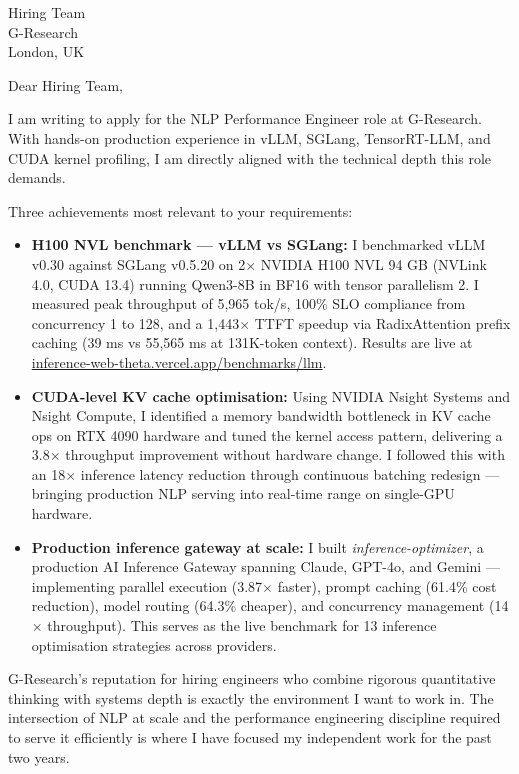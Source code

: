 \documentclass[12pt,a4paper]{letter}
\date{\today}
\begin{document}
\begin{letter}{Hiring Team \\ G-Research \\ London, UK}

\opening{Dear Hiring Team,}

I am writing to apply for the NLP Performance Engineer role at G-Research. With hands-on production experience in vLLM, SGLang, TensorRT-LLM, and CUDA kernel profiling, I am directly aligned with the technical depth this role demands.

Three achievements most relevant to your requirements:

\begin{itemize}
  \item \textbf{H100 NVL benchmark — vLLM vs SGLang:} I benchmarked vLLM v0.30 against SGLang v0.5.20 on 2$\times$ NVIDIA H100 NVL 94 GB (NVLink 4.0, CUDA 13.4) running Qwen3-8B in BF16 with tensor parallelism 2. I measured peak throughput of 5,965 tok/s, 100\% SLO compliance from concurrency 1 to 128, and a 1,443$\times$ TTFT speedup via RadixAttention prefix caching (39 ms vs 55,565 ms at 131K-token context). Results are live at \href{https://inference-web-theta.vercel.app/benchmarks/llm}{inference-web-theta.vercel.app/benchmarks/llm}.

  \item \textbf{CUDA-level KV cache optimisation:} Using NVIDIA Nsight Systems and Nsight Compute, I identified a memory bandwidth bottleneck in KV cache ops on RTX 4090 hardware and tuned the kernel access pattern, delivering a 3.8$\times$ throughput improvement without hardware change. I followed this with an 18$\times$ inference latency reduction through continuous batching redesign — bringing production NLP serving into real-time range on single-GPU hardware.

  \item \textbf{Production inference gateway at scale:} I built \textit{inference-optimizer}, a production AI Inference Gateway spanning Claude, GPT-4o, and Gemini — implementing parallel execution (3.87$\times$ faster), prompt caching (61.4\% cost reduction), model routing (64.3\% cheaper), and concurrency management (14$\times$ throughput). This serves as the live benchmark for 13 inference optimisation strategies across providers.
\end{itemize}

G-Research's reputation for hiring engineers who combine rigorous quantitative thinking with systems depth is exactly the environment I want to work in. The intersection of NLP at scale and the performance engineering discipline required to serve it efficiently is where I have focused my independent work for the past two years.


\end{letter}
\end{document}
